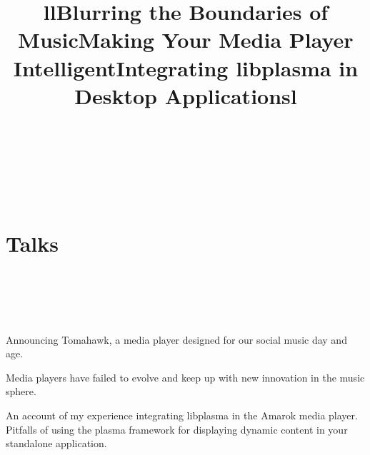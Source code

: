 \documentclass[overlapped,line,letterpaper]{res}
\begin{document}
\begin{resume}
\begin{format}
\\
\title{l}\\
\body\\
\end{format}

\section{\bf Talks}

\begin{format}
\\
\title{l}\\
\body\\
\end{format}

\title{Blurring the Boundaries of Music}
\begin{position}
\textbullet \space Announcing Tomahawk, a media player designed for our social music day and age. 
\end{position}

\title{Making Your Media Player Intelligent}
\begin{position}\textbullet \space Media players have failed to evolve and keep up with new innovation in the music sphere.
\end{position}

\title{Integrating libplasma in Desktop Applications}
\begin{position}\textbullet \space An account of my experience integrating libplasma in the Amarok media player. \\
\textbullet \space Pitfalls of using the plasma framework for displaying dynamic content in your standalone application.
\end{position}


\begin{format}
\\
\title{l}\\
\body\\
\end{format}


\end{resume}
\end{document}
